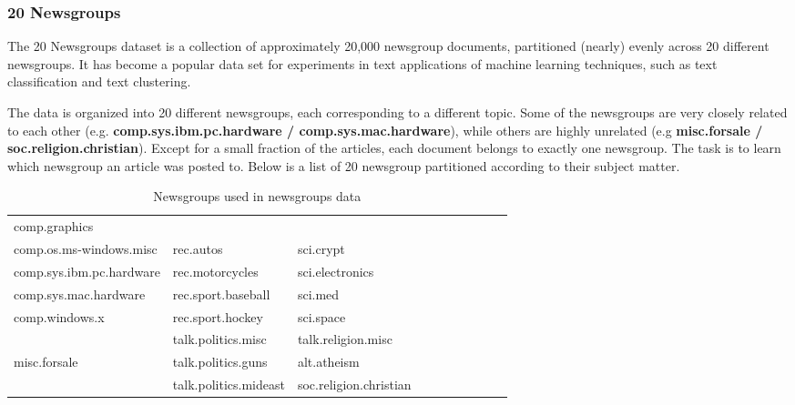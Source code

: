 \newpage
\subsubsection{20 Newsgroups}

The 20 Newsgroups dataset is a collection of approximately 20,000 newsgroup documents, partitioned (nearly) evenly across 20 different newsgroups. It has become a popular data set for experiments in text applications of machine learning techniques, such as text classification and text clustering.

The data is organized into 20 different newsgroups, each corresponding to a different topic. Some of the newsgroups are very closely related to each other (e.g.\textbf{ comp.sys.ibm.pc.hardware / comp.sys.mac.hardware}), while others are highly unrelated (e.g \textbf{misc.forsale / soc.religion.christian}). Except for a small fraction of the articles, each document belongs to exactly one newsgroup. The task is to learn which newsgroup an article was posted to. Below is a list of 20 newsgroup partitioned according to their subject matter.\\

\begin{table}[htbp]
\begin{tabular}{|l|l|l|lllllll}
\cline{1-3}
comp.graphics            &                       &                        &  &  &  &  &  &  &  \\
comp.os.ms-windows.misc  & rec.autos             & sci.crypt              &  &  &  &  &  &  &  \\
comp.sys.ibm.pc.hardware & rec.motorcycles       & sci.electronics        &  &  &  &  &  &  &  \\
comp.sys.mac.hardware    & rec.sport.baseball    & sci.med                &  &  &  &  &  &  &  \\
comp.windows.x           & rec.sport.hockey      & sci.space              &  &  &  &  &  &  &  \\ \cline{1-3}
                         & talk.politics.misc    & talk.religion.misc     &  &  &  &  &  &  &  \\
misc.forsale             & talk.politics.guns    & alt.atheism            &  &  &  &  &  &  &  \\
                         & talk.politics.mideast & soc.religion.christian &  &  &  &  &  &  &  \\ \cline{1-3}
\end{tabular}
\caption{\label{tab:widgets}Newsgroups used in newsgroups data}
\end{table}

